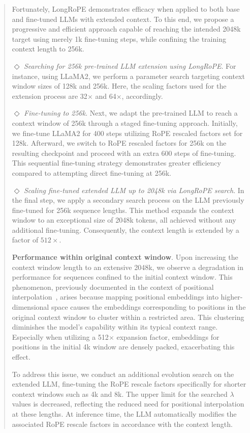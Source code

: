 \begin{abstract}
Fortunately, LongRoPE demonstrates efficacy when applied to both base and fine-tuned LLMs with extended context. To this end, we propose a progressive and efficient approach capable of reaching the intended 2048k target using merely 1k fine-tuning steps, while confining the training context length to 256k.

$\Diamond$ \textit{Searching for 256k pre-trained LLM extension using LongRoPE}. For instance, using LLaMA2, we perform a parameter search targeting context window sizes of 128k and 256k. Here, the scaling factors used for the extension process are 32$\times$ and 64$\times$, accordingly.

$\Diamond$ \textit{Fine-tuning to 256k}. Next, we adapt the pre-trained LLM to reach a context window of 256k through a staged fine-tuning approach. Initially, we fine-tune LLaMA2 for 400 steps utilizing RoPE rescaled factors set for 128k. Afterward, we switch to RoPE rescaled factors for 256k on the resulting checkpoint and proceed with an extra 600 steps of fine-tuning. This sequential fine-tuning strategy demonstrates greater efficiency compared to attempting direct fine-tuning at 256k.

$\Diamond$ \textit{Scaling fine-tuned extended LLM up to 2048k via LongRoPE search}. In the final step, we apply a secondary search process on the LLM previously fine-tuned for 256k sequence lengths. This method expands the context window to an exceptional size of 2048k tokens, all achieved without any additional fine-tuning. Consequently, the context length is extended by a factor of $512\times$.

\textbf{Performance within original context window}. Upon increasing the context window length to an extensive 2048k, we observe a degradation in performance for sequences confined to the initial context window. This phenomenon, previously documented in the context of positional interpolation~\cite{pi}, arises because mapping positional embeddings into higher-dimensional space causes the embeddings corresponding to positions in the original context window to cluster within a restricted area. This clustering diminishes the model’s capability within its typical context range. Especially when utilizing a 512$\times$ expansion factor, embeddings for positions in the initial 4k window are densely packed, exacerbating this effect.

To address this issue, we conduct an additional evolution search on the extended LLM, fine-tuning the RoPE rescale factors specifically for shorter context windows such as 4k and 8k. The upper limit for the searched $\lambda$ values is decreased, reflecting the reduced need for positional interpolation at these lengths. At inference time, the LLM automatically modifies the associated RoPE rescale factors in accordance with the context length.


\end{abstract}

